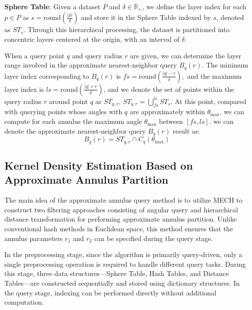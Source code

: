 \documentclass[conference]{IEEEtran}
\begin{document}
\textbf{Sphere Table}:
Given a dataset $P$ and $\delta \in \mathbb{R}_+$, we define the layer index for each $p \in P$ as $s = \mathrm{round}\left(\frac{|p|}{\delta}\right)$ and store it in the Sphere Table indexed by $s$, denoted as $ST_s$. Through this hierarchical processing, the dataset is partitioned into concentric layers centered at the origin, with an interval of $\delta$.

When a query point $q$ and query radius $r$ are given, we can determine the layer range involved in the approximate nearest-neighbor query $B_q(r)$. The minimum layer index corresponding to $B_q(r)$ is $fs = \mathrm{round}\!\left(\frac{|q| - r}{\delta}\right),$ and the maximum layer index is $ls = \mathrm{round}\!\left(\frac{|q| + r}{\delta}\right)$, and we denote the set of points within the query radius $r$ around point $q$ as $ST_{q,r}$, $ST_{q,r}= \bigcup_{fs}^{ls} ST_s$. At this point, compared with querying points whose angles with $q$ are approximately within $\theta_{\max}$, we can compute for each annulus the maximum angle $\theta_{\max}$ between $[fs, ls]$. we can denote the approximate nearest-neighbor query $B_q(r)$ result as:
\[
B_q(r) = ST_{q,r} \cap C_q(\theta_{\max})
\]


\subsection{Kernel Density Estimation Based on Approximate Annulus Partition}
The main idea of the approximate annulus query method is to utilize MECH to construct two filtering approaches consisting of angular query and hierarchical distance transformation for performing approximate annulus partition. Unlike conventional hash methods in Euclidean space, this method ensures that the annulus parameters $r_1$ and $r_2$ can be specified during the query stage.


In the preprocessing stage, since the algorithm is primarily query-driven, only a single preprocessing operation is required to handle different query tasks. During this stage, three data structures—Sphere Table, Hash Tables, and Distance Tables—are constructed sequentially and stored using dictionary structures. In the query stage, indexing can be performed directly without additional computation.
\end{document}

